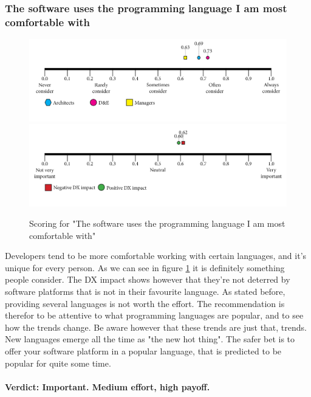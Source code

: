 \documentclass{article}
\begin{document}
\subsubsection{The software uses the programming language I am most comfortable with}
\begin{figure}[H]
\centering
\includegraphics[width=\linewidth]{scorelines/aspect15.png}
\includegraphics[width=\linewidth]{dxscorelines/dxaspect15.png}
\caption{Scoring for "The software uses the programming language I am most comfortable with"}
\label{fig:aspect15}
\end{figure}
Developers tend to be more comfortable working with certain languages, and it's unique for every person. As we can see in figure \ref{fig:aspect15} it is definitely something people consider. The DX impact shows however that they're not deterred by software platforms that is not in their favourite language. As stated before, providing several languages is not worth the effort. The recommendation is therefor to be attentive to what programming languages are popular, and to see how the trends change. Be aware however that these trends are just that, trends. New languages emerge all the time as "the new hot thing". The safer bet is to offer your software platform in a popular language, that is predicted to be popular for quite some time. \\ \\
\textbf{Verdict: Important. Medium effort, high payoff.}
\end{document}
